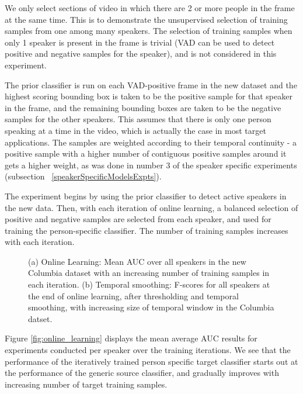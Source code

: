 \documentclass[runningheads]{llncs}
\begin{document}
We only select sections of video in which there are 2 or more people in the frame at the same time. This is to demonstrate the unsupervised selection of training samples from one among many speakers. The selection of training samples when only 1 speaker is present in the frame is trivial (VAD can be used to detect positive and negative samples for the speaker), and is not considered in this experiment.

The prior classifier is run on each VAD-positive frame in the new dataset and the highest scoring bounding box is taken to be the positive sample for that speaker in the frame, and the remaining bounding boxes are taken to be the negative samples for the other speakers. This assumes that there is only one person speaking at a time in the video, which is actually the case in most target applications. The samples are weighted according to their temporal continuity - a positive sample with a higher number of contiguous positive samples around it gets a higher weight, as was done in number 3 of the speaker specific experiments (subsection ~\ref{speakerSpecificModelsExpts}). 

The experiment begins by using the prior classifier to detect active speakers in the new data. Then, with each iteration of online learning, a balanced selection of positive and negative samples are selected from each speaker, and used for training the person-specific classifier. The number of training samples increases with each iteration.

\begin{figure}[t]
\vspace*{-0.4cm} 
  \centering
  \hfill
     \caption{(a) Online Learning: Mean AUC over all speakers in the new Columbia dataset with an increasing number of training samples in each iteration. (b) Temporal smoothing: F-scores for all speakers at the end of online learning, after thresholding and temporal smoothing, with increasing size of temporal window in the Columbia datset.}
\vspace*{-0.8cm} 
\end{figure}

Figure \ref{fig:online_learning} displays the mean average AUC results for experiments conducted per speaker over the training iterations. We see that the performance of the iteratively trained person specific target classifier starts out at the performance of the generic source classifier, and gradually improves with increasing number of target training samples.
\end{document}
